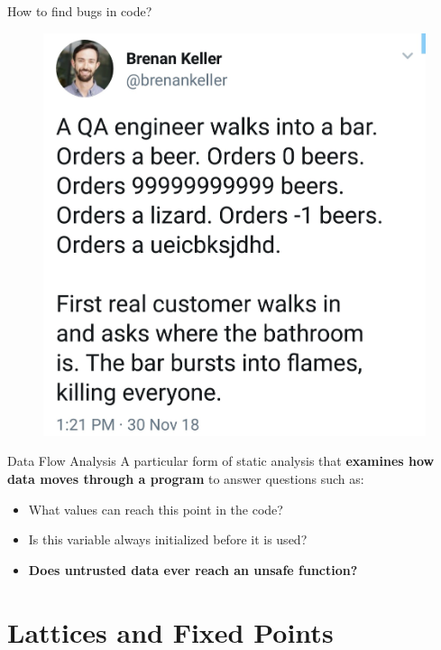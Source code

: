 \documentclass[aspectratio=169,xcolor=dvipsnames]{beamer}
\begin{document}
\begin{frame}{How to find bugs in code?}
	\begin{figure}
		\includegraphics[height=0.8\textheight]{img/1.jpeg}
	\end{figure}
\end{frame}


\begin{frame}{Data Flow Analysis}
	A particular form of static analysis that {\bf examines how data moves through a program} to answer questions such as:
	\begin{itemize}
		\item What values can reach this point in the code?
		\item Is this variable always initialized before it is used?
		\item \alert{\bf Does untrusted data ever reach an unsafe function?}
	\end{itemize}
\end{frame}

\section{Lattices and Fixed Points}
\end{document}
